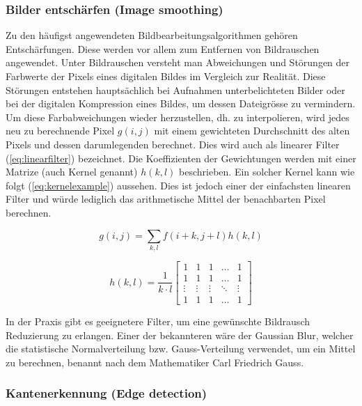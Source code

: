 \subsubsection{Bilder entschärfen (Image smoothing)}

Zu den häufigst angewendeten Bildbearbeitungsalgorithmen gehören Entschärfungen. Diese werden vor allem zum Entfernen von Bildrauschen angewendet. Unter Bildrauschen versteht man Abweichungen und Störungen der Farbwerte der Pixels eines digitalen Bildes im Vergleich zur Realität. Diese Störungen entstehen hauptsächlich bei Aufnahmen unterbelichteten Bilder oder bei der digitalen Kompression eines Bildes, um dessen Dateigrösse zu vermindern. Um diese Farbabweichungen wieder herzustellen, dh. zu interpolieren, wird jedes neu zu berechnende Pixel $g(i,j)$ mit einem gewichteten Durchschnitt des alten Pixels und dessen darumlegenden berechnet. Dies wird auch als linearer Filter (\ref{eq:linearfilter}) bezeichnet. Die Koeffizienten der Gewichtungen werden mit einer Matrize (auch Kernel genannt) $h(k,l)$ beschrieben. Ein solcher Kernel kann wie folgt (\ref{eq:kernelexample}) aussehen. Dies ist jedoch einer der einfachsten linearen Filter und würde lediglich das arithmetische Mittel der benachbarten Pixel berechnen.  \cite{opencv_bradski_kaehler:1, opencv_doc_blur:1}

\begin{equation}
	g(i,j) = \sum_{k,l} f(i+k,j+l)h(k,l)
	\label{eq:linearfilter}
\end{equation}
\cite{opencv_doc_blur:1}



\begin{equation}
	h(k,l) = \frac{1}{k \cdot l}
	\begin{bmatrix}
  	1      & 1      & 1      & \dots  &      1 \\
	1      & 1      & 1      & \dots  &      1 \\
	 \vdots & \vdots & \vdots & \ddots & \vdots \\
	 1      & 1      & 1      & \dots  &      1
	\end{bmatrix}	
	\label{eq:kernelexample}
\end{equation}
\cite{opencv_doc_blur:1}

In der Praxis gibt es geeignetere Filter, um eine gewünschte Bildrausch Reduzierung zu erlangen. Einer der bekannteren wäre der Gaussian Blur, welcher die statistische Normalverteilung bzw. Gauss-Verteilung verwendet, um ein Mittel zu berechnen, benannt nach dem Mathematiker Carl Friedrich Gauss. \cite{carlfriedrichgauss:1}

\subsubsection{Kantenerkennung (Edge detection)}

